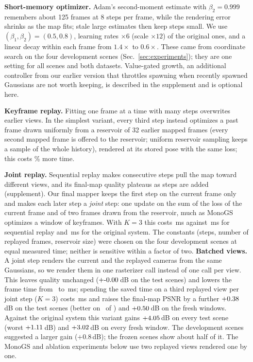 \documentclass[10pt,twocolumn,letterpaper]{article}
\begin{document}
\textbf{Short-memory optimizer.} Adam's second-moment estimate with $\beta_2{=}0.999$ remembers about 125 frames at 8 steps per frame, while the rendering error shrinks as the map fits; stale large estimates then keep steps small. We use $(\beta_1,\beta_2)=(0.5,0.8)$, learning rates $\times6$ (scale $\times12$) of the original ones, and a linear decay within each frame from $1.4\times$ to $0.6\times$. These came from coordinate search on the four development scenes (Sec.~\ref{sec:experiments}); they are one setting for all scenes and both datasets. Value-gated growth, an additional controller from our earlier version that throttles spawning when recently spawned Gaussians are not worth keeping, is described in the supplement and is optional here.

\textbf{Keyframe replay.} Fitting one frame at a time with many steps overwrites earlier views. In the simplest variant, every third step instead optimizes a past frame drawn uniformly from a reservoir of 32 earlier mapped frames (every second mapped frame is offered to the reservoir; uniform reservoir sampling keeps a sample of the whole history), rendered at its stored pose with the same loss; this costs \engReplayTimeOverheadKThree\% more time.

\textbf{Joint replay.} Sequential replay makes consecutive steps pull the map toward different views, and its final-map quality plateaus as steps are added (supplement). Our final mapper keeps the first step on the current frame only and makes each later step a \emph{joint} step: one update on the sum of the loss of the current frame and of two frames drawn from the reservoir, much as MonoGS optimizes a window of keyframes. With $K{=}3$ this costs \engMsKThreeJr\,ms against \engMsKThreeRp\,ms for sequential replay and \engMsOrig\,ms for the original system. The constants (steps, number of replayed frames, reservoir size) were chosen on the four development scenes at equal measured time; neither is sensitive within a factor of two. \textbf{Batched views.} A joint step renders the current and the replayed cameras from the same Gaussians, so we render them in one rasterizer call instead of one call per view. This leaves quality unchanged ($+\engKeepDTestKThreeJrbMinusKThreeJrMean$\,dB on the test scenes) and lowers the frame time from \engMsTestKThreeJr\ to \engMsTestKThreeJrb\,ms; spending the saved time on a third replayed view per joint step ($K{=}3$) costs \engMsTestKThreeJrThreeB\,ms and raises the final-map PSNR by a further $+0.38$\,dB on the test scenes (better on \engKeepDTestKThreeJrThreeBMinusKThreeJrPos\ of \engKeepTestN) and $+0.50$\,dB on the fresh windows. Against the original system this variant gains $+4.05$\,dB on every test scene (worst $+1.11$\,dB) and $+3.02$\,dB on every fresh window. The development scenes suggested a larger gain ($+0.8$\,dB); the frozen scenes show about half of it. The MonoGS and ablation experiments below use two replayed views rendered one by one.
\end{document}
